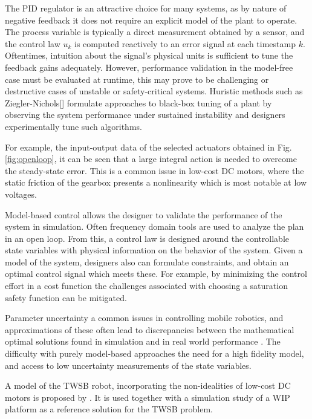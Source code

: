         The PID regulator is an attractive choice for many systems, as by nature of negative feedback it does not 
        require an explicit model of the plant to operate. The process variable is typically a direct measurement 
        obtained by a sensor, and the control law $u_k$ is computed reactively to an error signal at each timestamp $k$.
        Oftentimes, intuition about the signal's physical units is sufficient to tune the feedback gains adequately. 
        However, performance validation in the model-free case must be evaluated at runtime, this may prove to be 
        challenging or destructive cases of unstable or safety-critical systems. Huristic methods such as Ziegler-Nichols[]
        formulate approaches to black-box tuning of a plant by observing the system 
        performance under sustained instability and designers experimentally tune such algorithms.
    
        For example, the input-output data of the selected actuators obtained in Fig.\ref{fig:openloop}, 
        it can be seen that a large integral action is needed to overcome the steady-state error.
        This is a common issue in low-cost DC motors, where the static friction of the gearbox presents 
        a nonlinearity which is most notable at low voltages. 
    
        Model-based control allows the designer to validate the performance of the system in simulation. 
        Often frequency domain tools are used to analyze the plan in an open loop. From this, a control law is designed around 
        the controllable state variables with physical information on the behavior of the system.
        Given a model of the system, designers also can formulate constraints, 
        and obtain an optimal control signal which meets these. For example, by minimizing the control effort in a cost function
        the challenges associated with choosing a saturation safety function can be mitigated.
    
        Parameter uncertainty a common issues in controlling mobile robotics, and approximations of these often lead to 
        discrepancies between the mathematical optimal solutions found in simulation \cite{eide2011lqg} 
        and in real world performance \cite{tran2023fuzzy}. The difficulty with purely model-based approaches 
        the need for a high fidelity model, and access to low uncertainty measurements of the state variables.
    
        A model of the TWSB robot, incorporating the non-idealities of low-cost DC motors is proposed by \cite{yamamoto2008nxtway}.
        It is used together with a simulation study of a WIP platform as a reference solution for the TWSB problem.
    
